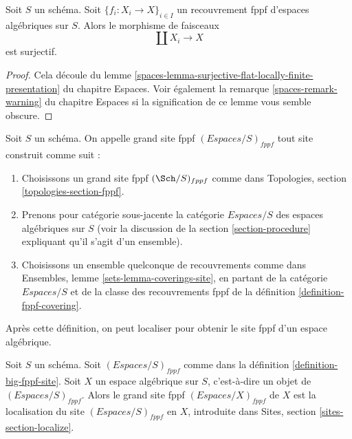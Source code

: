 \begin{lemma}
\label{lemma-fppf-covering-surjective}
Soit $S$ un schéma.
Soit $\{f_i : X_i \to X\}_{i \in I}$ un recouvrement fppf d'espaces algébriques
sur $S$. Alors le morphisme de faisceaux
$$
\coprod X_i \longrightarrow X
$$
est surjectif.
\end{lemma}

\begin{proof}
Cela découle du lemme
\ref{spaces-lemma-surjective-flat-locally-finite-presentation} du chapitre Espaces.
Voir également la remarque
\ref{spaces-remark-warning} du chapitre Espaces
si la signification de ce lemme vous semble obscure.
\end{proof}

\begin{definition}
\label{definition-big-fppf-site}
Soit $S$ un schéma. On appelle grand site fppf
{\it $(\textit{Espaces}/S)_{fppf}$} tout site construit comme suit :
\begin{enumerate}
\item Choisissons un grand site fppf $(\Sch/S)_{fppf}$ comme dans
Topologies, section \ref{topologies-section-fppf}.
\item Prenons pour catégorie sous-jacente la catégorie $\textit{Espaces}/S$
des espaces algébriques sur $S$ (voir la discussion de la
section \ref{section-procedure} expliquant qu'il s'agit d'un ensemble).
\item Choisissons un ensemble quelconque de recouvrements comme dans
Ensembles, lemme \ref{sets-lemma-coverings-site}, en partant de la
catégorie $\textit{Espaces}/S$ et de la classe des recouvrements fppf
de la définition \ref{definition-fppf-covering}.
\end{enumerate}
\end{definition}

\noindent
Après cette définition, on peut localiser pour obtenir le site fppf
d'un espace algébrique.

\begin{definition}
\label{definition-big-small-fppf}
Soit $S$ un schéma. Soit $(\textit{Espaces}/S)_{fppf}$ comme dans
la définition \ref{definition-big-fppf-site}.
Soit $X$ un espace algébrique sur $S$, c'est-à-dire un objet de
$(\textit{Espaces}/S)_{fppf}$. Alors le grand site fppf
{\it $(\textit{Espaces}/X)_{fppf}$} de $X$
est la localisation du site $(\textit{Espaces}/S)_{fppf}$
en $X$, introduite dans Sites, section \ref{sites-section-localize}.
\end{definition}

